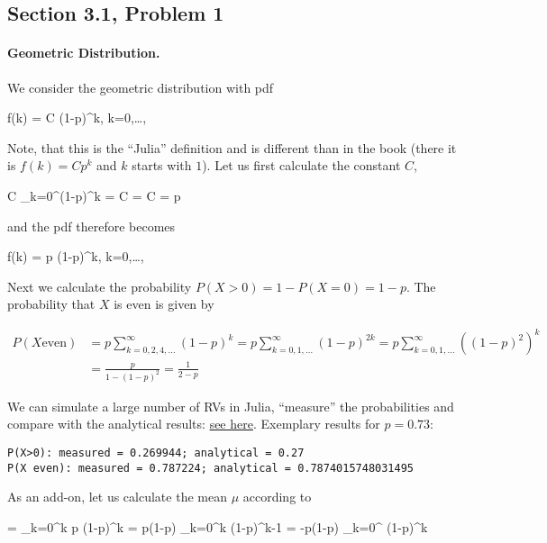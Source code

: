 
\subsection{Section 3.1, Problem 1}

\paragraph{Geometric Distribution.} We consider the geometric distribution with pdf

\bee
f(k) = C (1-p)^k, \quad k=0,\ldots,\infty
\eee

Note, that this is the ``Julia'' definition and is different than in the book (there it is $f(k) = Cp^k$ and $k$ starts with $1$). Let us first calculate the constant $C$,

\bee
C \sum_{k=0}^\infty (1-p)^k = C  =   \rightarrow C = p
\eee

and the pdf therefore becomes

\bee
f(k) =  p (1-p)^k, \quad k=0,\ldots,\infty
\eee

Next we calculate the probability $P(X>0) = 1 - P(X=0) = 1-p$. The probability that $X$ is even is given by

\begin{align*}
P(X \text{even}) &= p \sum_{k=0,2,4,\ldots}^\infty (1-p)^k = p \sum_{k=0,1,\ldots}^\infty (1-p)^{2k} = p \sum_{k=0,1,\ldots}^\infty \left((1-p)^{2}\right)^k \\ &= \frac{p}{1-(1-p)^2} = \frac{1}{2-p}
\end{align*}

We can simulate a large number of RVs in Julia, ``measure'' the probabilities and compare with the analytical results: \href{https://github.com/ClemensFMN/JuliaStuff/blob/master/stochastic/geom_rv_2.jl}{see here}. Exemplary results for $p=0.73$:

\begin{verbatim}
P(X>0): measured = 0.269944; analytical = 0.27
P(X even): measured = 0.787224; analytical = 0.7874015748031495
\end{verbatim}

As an add-on, let us calculate the mean $\mu$ according to

\bee
\mu = \sum_{k=0}^\infty k p (1-p)^k = p(1-p) \sum_{k=0}^\infty k (1-p)^{k-1} = -p(1-p) \sum_{k=0}^\infty {} (1-p)^{k}
\eee

